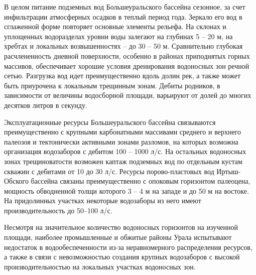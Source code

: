 В целом питание подземных вод Большеуральского бассейна сезонное, за счет инфильтрации атмосферных осадков в теплый период года. Зеркало его вод в сглаженной форме повторяет основные элементы рельефа. На склонах и уплощенных водоразделах уровни воды залегают на глубинах 5 – 20 м, на хребтах и локальных возвышенностях – до 30 – 50 м. Сравнительно глубокая расчлененность дневной поверхности, особенно в районах приподнятых горных массивов, обеспечивает хорошие условия дренирования водоносных зон речной сетью. Разгрузка вод идет преимущественно вдоль долин рек, а также может быть приурочена к локальным трещинным зонам. Дебиты родников, в зависимости от величины водосборной площади, варьируют от долей до многих десятков литров в секунду.

Эксплуатационные ресурсы Большеуральского бассейна связываются преимущественно с крупными карбонатными массивами среднего и верхнего палеозоя и тектонически активными зонами разломов, на которых возможна организация водозаборов с дебитом 100 – 1000 л/с. На остальных водоносных зонах трещиноватости возможен каптаж подземных вод по отдельным кустам скважин с дебитами от 10 до 30 л/с. Ресурсы порово-пластовых вод Иртыш-Обского бассейна связаны преимущественно с опоковым горизонтом палеоцена, мощность обводненной толщи которого 3 – 4 м на западе и до 50 м на востоке. На придолинных участках некоторые водозаборы из него имеют производительность до 50–100 л/с.

Несмотря на значительное количество водоносных горизонтов на изученной площади, наиболее промышленные и обжитые районы Урала испытывают недостаток в водообеспеченности из-за неравномерного распределения ресурсов, а также в связи с невозможностью создания крупных водозаборов с высокой производительностью на локальных участках водоносных зон.

